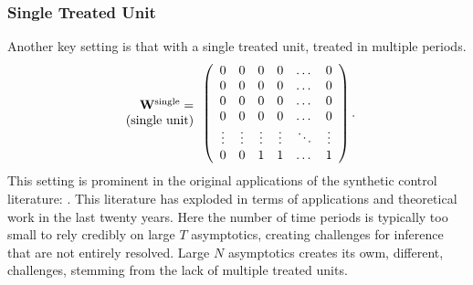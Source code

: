 \documentclass[letterpaper,12pt,leqno]{article}
\newcommand{\single}{{\rm single}}
\newcommand{\ttock}{1}
\newcommand{\ttick}{0}
\newcommand{\bw}{{\bf W}}
\begin{document}
\subsubsection{Single Treated Unit}
Another key setting is that with a single treated unit, treated in multiple periods.
\[ 
\begin{array}{r}\bw^\single=\\ 
(\text{single unit})
\end{array}\left(
\begin{array}{cccccccc}
	\ttick & \ttick & \ttick  & \ttick & \dots & \ttick \\
	\ttick  & \ttick & \ttick & \ttick   & \dots & \ttick  \\
	\ttick  & \ttick & \ttick  & \ttick  & \dots & \ttick  \\
	\ttick  & \ttick & \ttick & \ttick   & \dots & \ttick  \\
	\vdots   &  \vdots  &  \vdots& \vdots &\ddots &\vdots \\
	\ttick  & \ttick & \ttock   & {\ttock} & \dots & {\ttock}  \\
\end{array}
\right).\]  
This setting is prominent in the original applications of the {synthetic control} literature: \citep{abadie2003,abadie2010synthetic, abadie2019using}. This literature has exploded in terms of applications and theoretical work in the last twenty years. Here the number of time periods is typically too small to rely credibly on large $T$ asymptotics, creating challenges for inference that are not entirely resolved. Large $N$ asymptotics creates its owm, different, challenges, stemming from the lack of multiple treated units.
\end{document}
